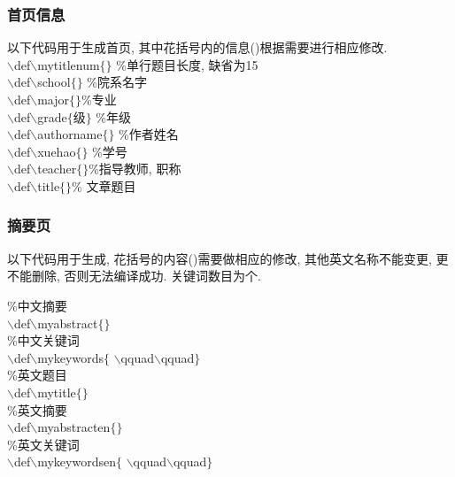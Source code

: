 \documentclass[a4paper,12pt,twoside]{ctexart}
\begin{document}
    \subsubsection{首页信息}
    以下代码用于生成首页, 其中花括号内的信息()根据需要进行相应修改.\\
    \indent$\backslash$def$\backslash$mytitlenum$\{$$\}$
    \qquad\quad\%单行题目长度, 缺省为15\\
    \indent$\backslash$def$\backslash$school$\{$$\}$ \qquad\quad \%院系名字\\
    \indent$\backslash$def$\backslash$major$\{$$\}$\qquad\quad \%专业\\
    \indent $\backslash$def$\backslash$grade$\{$级$\}$ \qquad\quad \%年级\\
    \indent $\backslash$def$\backslash$authorname$\{$$\}$ \qquad\quad \%作者姓名\\
    \indent$\backslash$def$\backslash$xuehao$\{$$\}$ \quad\qquad \%学号\\
    \indent$\backslash$def$\backslash$teacher$\{$$\}$\qquad\quad \%指导教师, 职称\\
    \indent$\backslash$def$\backslash$title$\{$$\}$\qquad\quad \% 文章题目

    \subsubsection{摘要页}
    以下代码用于生成, 花括号的内容()需要做相应的修改, 其他英文名称不能变更, 更不能删除, 否则无法编译成功. 关键词数目为个.

    \indent\%中文摘要\\
    \indent$\backslash$def$\backslash$myabstract$\{$$\}$\\
    \indent\%中文关键词\\
    \indent$\backslash$def$\backslash$mykeywords$\{$ $\backslash$qquad\quad {}$\backslash$qquad\quad {}$\}$\\ \indent
    \%英文题目\\
    \indent$\backslash$def$\backslash$mytitle$\{$$\}$\\
    \indent\%英文摘要\\
    \indent$\backslash$def$\backslash$myabstracten$\{$$\}$\\
    \indent\%英文关键词\\
    \indent$\backslash$def$\backslash$mykeywordsen$\{$ $\backslash$qquad\quad {}$\backslash$qquad\quad {}$\}$
\end{document}
